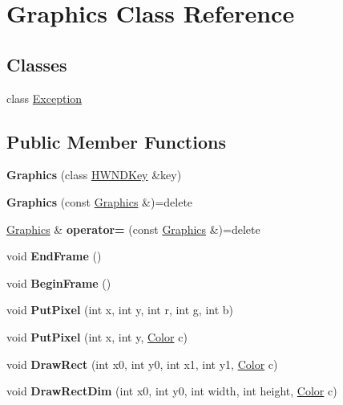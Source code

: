 \hypertarget{class_graphics}{}\section{Graphics Class Reference}
\label{class_graphics}
\subsection*{Classes}
\begin{DoxyCompactItemize}
\item 
class \hyperlink{class_graphics_1_1_exception}{Exception}
\end{DoxyCompactItemize}
\subsection*{Public Member Functions}
\begin{DoxyCompactItemize}
\item 
\mbox{\label{class_graphics_ab29fadd0d25fa1313d89c84443f49122}} 
{\bfseries Graphics} (class \hyperlink{class_h_w_n_d_key}{H\+W\+N\+D\+Key} \&key)
\item 
\mbox{\label{class_graphics_abe2f13f24a1d35c55fdac10a282744eb}} 
{\bfseries Graphics} (const \hyperlink{class_graphics}{Graphics} \&)=delete
\item 
\mbox{\label{class_graphics_abaf6bc20f9541026835dfee157ac5efb}} 
\hyperlink{class_graphics}{Graphics} \& {\bfseries operator=} (const \hyperlink{class_graphics}{Graphics} \&)=delete
\item 
\mbox{\label{class_graphics_a56203cba547bde8af2eadda01e0d17c3}} 
void {\bfseries End\+Frame} ()
\item 
\mbox{\label{class_graphics_ae9f5bcaa267fdff06bbfcf1e2ddf7137}} 
void {\bfseries Begin\+Frame} ()
\item 
\mbox{\label{class_graphics_a64e7971066ee21f5b77aa525742f29e2}} 
void {\bfseries Put\+Pixel} (int x, int y, int r, int g, int b)
\item 
\mbox{\label{class_graphics_a69fae0334426fd8a8a271d9843d4f7fe}} 
void {\bfseries Put\+Pixel} (int x, int y, \hyperlink{class_color}{Color} c)
\item 
\mbox{\label{class_graphics_ab90ddf2598eb05b8161e18683796188f}} 
void {\bfseries Draw\+Rect} (int x0, int y0, int x1, int y1, \hyperlink{class_color}{Color} c)
\item 
\mbox{\label{class_graphics_a666082287b610f4928feddf666ee296d}} 
void {\bfseries Draw\+Rect\+Dim} (int x0, int y0, int width, int height, \hyperlink{class_color}{Color} c)
\end{DoxyCompactItemize}
